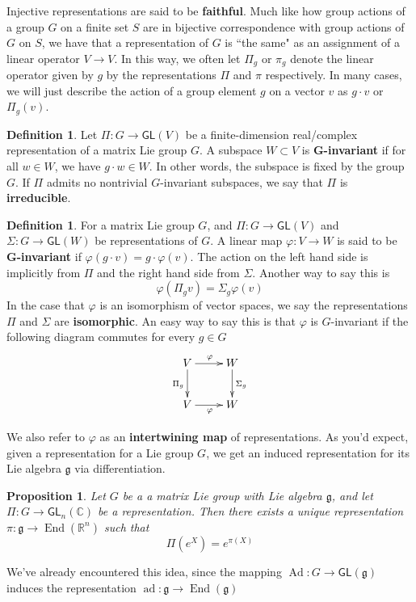 \documentclass[psamsfonts]{amsart}
\newtheorem{prop}[thm]{Proposition}
\theoremstyle{definition}
\newtheorem{defn}[thm]{Definition}
\theoremstyle{remark}
\newcommand{\R}{\mathbb{R}}
\newcommand{\C}{\mathbb{C}}
\newcommand{\GL}{\mathsf{GL}}
\newcommand{\g}{\mathfrak{g}}
\DeclareMathOperator{\ad}{ad}
\DeclareMathOperator{\End}{End}
\DeclareMathOperator{\Ad}{Ad}
\begin{document}
Injective representations are said to be \textbf{faithful}. Much like how group actions of a group $G$ on a finite set $S$ are in bijective correspondence with group actions of $G$ on $S$, we have that a representation of $G$ is ``the same" as an assignment of a linear operator $V \to V$. In this way, we often let $\Pi_g$ or $\pi_g$ denote the linear operator given by $g$ by the representations $\Pi$ and $\pi$ respectively. In many cases, we will just describe the action of a group element $g$ on a vector $v$ as $g\cdot v$ or $\Pi_g(v)$.

\begin{defn}
Let $\Pi: G \to \GL(V)$ be a finite-dimension real/complex representation of a matrix Lie group $G$. A subspace $W \subset V$ is \textbf{G-invariant} if for all $w \in W$, we have $g \cdot w \in W$. In other words, the subspace is fixed by the group $G$. If $\Pi$ admits no nontrivial $G$-invariant subspaces, we say that $\Pi$ is \textbf{irreducible}.
\end{defn}

\begin{defn}
For a matrix Lie group $G$, and $\Pi: G \to \GL(V)$ and $\Sigma: G\to \GL(W)$ be representations of $G$. A linear map $\varphi: V \to W$ is said to be \textbf{G-invariant} if $\varphi(g \cdot v) = g\cdot \varphi(v)$. The action on the left hand side is implicitly from $\Pi$ and the right hand side from $\Sigma$. Another way to say this is 
$$\varphi(\Pi_gv) = \Sigma_g\varphi(v) $$
In the case that $\varphi$ is an isomorphism of vector spaces, we say the representations $\Pi$ and $\Sigma$ are \textbf{isomorphic}. An easy way to say this is that $\varphi$ is $G$-invariant if the following diagram commutes for every $g \in G$
$$\xymatrix{
V \ar[d]_{\Pi_g}\ar[r]^\varphi & W \ar[d]^{\Sigma_g} \\
V \ar[r]_\varphi & W
} $$
\end{defn}
We also refer to $\varphi$ as an \textbf{intertwining map} of representations. As you'd expect, given a representation for a Lie group $G$, we get an induced representation for its Lie algebra $\g$ via differentiation.

\begin{prop}
Let $G$ be a a matrix Lie group with Lie algebra $\g$, and let $\Pi:G \to \GL_n(\C)$ be a representation. Then there exists a unique representation $\pi: \g \to \End(\R^n)$ such that 
$$\Pi(e^X) = e^{\pi(X)} $$
\end{prop}

We've already encountered this idea, since the mapping $\Ad: G \to \GL(\g)$ induces the representation $\ad: \g \to \End(\g)$
\end{document}
